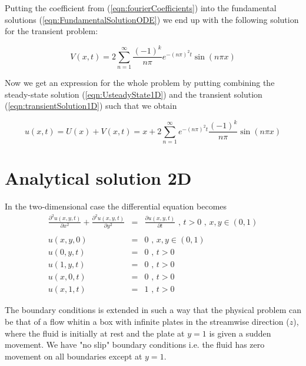 \documentclass{article}
\begin{document}
Putting the coefficient from (\ref{eqn:fourierCoefficients}) into the fundamental solutions (\ref{eqn:FundamentalSolutionODE}) we end up with the following solution for the transient problem:

\begin{equation}
V(x,t) = 2\sum_{n=1}^{\infty} \frac{(-1)^k}{n\pi} e^{-(n\pi)^2 t}\sin(n\pi x)
\label{eqn:transientSolution1D}
\end{equation}

Now we get an expression for the whole problem by putting combining the steady-state solution (\ref{eqn:UsteadyState1D}) and the transient solution (\ref{eqn:transientSolution1D}) such that we obtain 

\begin{equation}
u(x,t) = U(x) + V(x,t) = x + 2\sum_{n=1}^{\infty}e^{-(n\pi)^2 t} \frac{(-1)^k}{n\pi}
\sin(n\pi x)
\label{eqn:solution1D}
\end{equation}

\section{Analytical solution 2D}
In the two-dimensional case the differential equation becomes
\begin{subequations}
	\begin{eqnarray}
	\frac{\partial^2 u(x,y,t)}{\partial x^2} + \frac{\partial^2 u(x,y,t)}{\partial y^2} &=&  \frac{\partial u(x,y,t)}{\partial t} \textit{ , } t>0 \textit{ , } x,y \in (0,1) \\ \nonumber \\
	u(x,y,0) &=& 0 \textit{ , } x,y \in (0,1) \\ 
	u(0,y,t) &=& 0 \textit{ , } t> 0 \\
	u(1,y,t) &=& 0 \textit{ , } t> 0 \\
	u(x,0,t) &=& 0 \textit{ , } t> 0  \\
	u(x,1,t) &=& 1 \textit{ , } t> 0 
	\end{eqnarray}
\end{subequations}

The boundary conditions is extended in such a way that the physical problem can be that of a flow whitin a box with infinite plates in the streamwise direction ($z$), where the fluid is initially at rest and the plate at $y=1$ is given a sudden movement. We have "no slip" boundary conditions i.e. the fluid has zero movement on all boundaries except at $y=1$.\\
\end{document}
